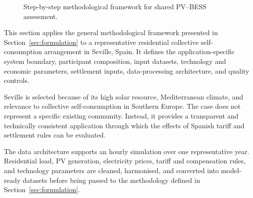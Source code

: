 \begin{figure}[!htbp]
\centering
{}
\caption{Step-by-step methodological framework for shared PV--BESS assessment.}
\label{fig:ch3_model_flow}
\end{figure}

This section applies the general methodological framework presented in Section~\ref{sec:formulation} to a representative residential collective self-consumption arrangement in Seville, Spain. It defines the application-specific system boundary, participant composition, input datasets, technology and economic parameters, settlement inputs, data-processing architecture, and quality controls.

Seville is selected because of its high solar resource, Mediterranean climate, and relevance to collective self-consumption in Southern Europe. The case does not represent a specific existing community. Instead, it provides a transparent and technically consistent application through which the effects of Spanish tariff and settlement rules can be evaluated.

The data architecture supports an hourly simulation over one representative year. Residential load, PV generation, electricity prices, tariff and compensation rules, and technology parameters are cleaned, harmonised, and converted into model-ready datasets before being passed to the methodology defined in Section~\ref{sec:formulation}.

